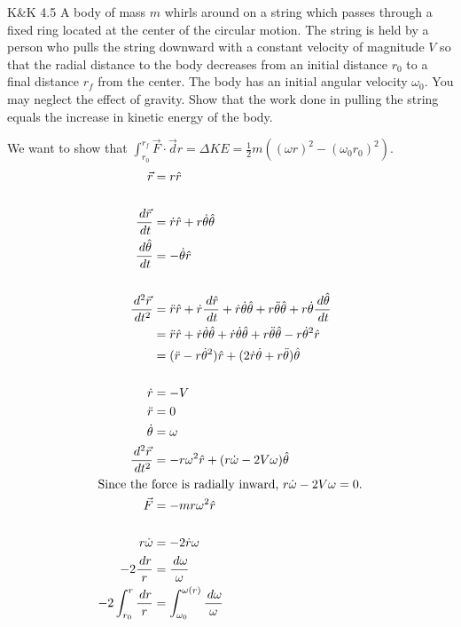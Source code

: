 \documentclass{esg8012pset}
\renewcommand{\d}{\,d}
\begin{document}
\begin{problem}{K\&K 4.5}
  A body of mass $m$ whirls around on a string which passes through a fixed ring located at the center of the circular motion. The string is held by a person who pulls the string downward with a constant velocity of magnitude $V$ so that the radial distance to the body decreases from an initial distance $r_0$ to a final distance $r_f$ from the center. The body has an initial angular velocity $\omega_0$. You may neglect the effect of gravity. Show that the work done in pulling the string equals the increase in kinetic energy of the body.
\end{problem}
\begin{solution}
  We want to show that $\displaystyle \int_{r_0}^{r_f}\vec F \cdot \vec d r = \Delta KE = \frac{1}{2}m\left((\omega r)^2 - (\omega_0 r_0)^2\right)$.
  \begin{align*}
  \vec r & = r \hat r \\
  \\
  \frac{\d \vec r}{\d t} & = \dot r\hat r + r\dot\theta\hat\theta \\
  \frac{\d \hat \theta}{\d t} & = -\dot\theta\hat r \\
  \\
  \frac{\d^2 \vec r}{\d t^2} & = \ddot r\hat r + \dot r\frac{\d \hat r}{\d t} + \dot r\dot\theta\hat\theta + r\ddot\theta\hat\theta + r\dot\theta\frac{\d \hat\theta}{\d t} \\
    & = \ddot r\hat r + \dot r\dot\theta\hat\theta + \dot r\dot\theta\hat\theta + r\ddot\theta\hat\theta - r\dot\theta^2\hat r \\
    & = (\ddot r - r\dot\theta^2)\hat r + (2\dot r\dot\theta + r\ddot\theta)\hat\theta \\
  \\
  \dot r & = -V \\
  \ddot r & = 0 \\
  \dot\theta & = \omega \\
  \frac{\d^2 \vec r}{\d t^2} & = -r\omega^2\hat r + (r\dot\omega - 2V\omega)\hat\theta \\
  \intertext{Since the force is radially inward, $r\dot\omega - 2V\omega = 0$.}
  \vec F & = -mr\omega^2\hat r \\
  \\
  r\dot\omega & = -2\dot r\omega \\
  -2\frac{\d r}{r} & = \frac{\d \omega}{\omega} \\
  -2\int_{r_0}^{r}\frac{\d r}{r} & = \int_{\omega_0}^{\omega(r)}\frac{\d \omega}{\omega} \\

\end{align*}
\end{solution}
\end{document}
